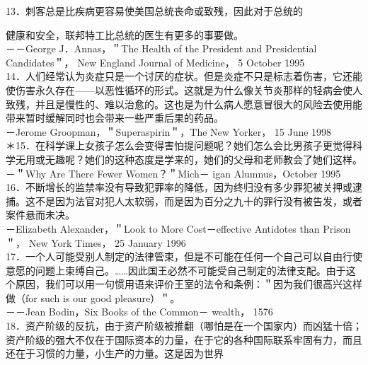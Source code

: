 13．刺客总是比疾病更容易使美国总统丧命或致残，因此对于总统的

健康和安全，联邦特工比总统的医生有更多的事要做。\\
－－George J．Annas，＂The Health of the President and Presidential Candidates＂， New England Journal of Medicine， 5 October 1995\\
14．人们经常认为炎症只是一个讨厌的症状。但是炎症不只是标志着伤害，它还能使伤害永久存在——以恶性循环的形式。这就是为什么像关节炎那样的轻病会使人致残，并且是慢性的、难以治愈的。这也是为什么病人愿意冒很大的风险去使用能带来暂时缓解同时也会带来一些严重后果的药品。\\
－Jerome Groopman，＂Superaspirin＂，The New Yorker， 15 June 1998\\
＊15．在科学课上女孩子怎么会变得害怕提问题呢？她们怎么会比男孩子更觉得科学无用或无趣呢？她们的这种态度是学来的，她们的父母和老师教会了她们这样。\\
－＂Why Are There Fewer Women？＂Mich－ igan Alumnus，October 1995\\
16．不断增长的监禁率没有导致犯罪率的降低，因为终归没有多少罪犯被关押或逮捕。这不是因为法官对犯人太软弱，而是因为百分之九十的罪行没有被告发，或者案件悬而未决。\\
－Elizabeth Alexander，＂Look to More Cost－effective Antidotes than Prison＂， New York Times， 25 January 1996\\
17．一个人可能受别人制定的法律管束，但是不可能在任何一个自己可以自由行使意愿的问题上束缚自己。……因此国王必然不可能受自己制定的法律支配。由于这个原因，我们可以用一句惯用语来评价王室的法令和条例：＂因为我们很高兴这样做（for such is our good pleasure）＂。\\
－－Jean Bodin，Six Books of the Common－ wealth， 1576\\
18．资产阶级的反抗，由于资产阶级被推翻（哪怕是在一个国家内）而凶猛十倍；资产阶级的强大不仅在于国际资本的力量，在于它的各种国际联系牢固有力，而且还在于习惯的力量，小生产的力量。这是因为世界

